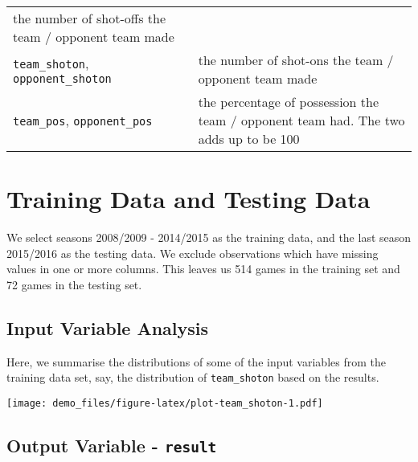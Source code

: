 \documentclass[]{book}
\theoremstyle{definition}
\theoremstyle{definition}
\theoremstyle{definition}
\theoremstyle{remark}
\begin{document}
\begin{longtable}[]{@{}ll@{}}
\begin{minipage}[t]{0.51\columnwidth}
the number of shot-offs the team / opponent team made\strut
\end{minipage}\tabularnewline
\begin{minipage}[t]{0.43\columnwidth}\raggedright\strut
\texttt{team\_shoton}, \texttt{opponent\_shoton}\strut
\end{minipage} & \begin{minipage}[t]{0.51\columnwidth}\raggedright\strut
the number of shot-ons the team / opponent team made\strut
\end{minipage}\tabularnewline
\begin{minipage}[t]{0.43\columnwidth}\raggedright\strut
\texttt{team\_pos}, \texttt{opponent\_pos}\strut
\end{minipage} & \begin{minipage}[t]{0.51\columnwidth}\raggedright\strut
the percentage of possession the team / opponent team had. The two adds
up to be 100\strut
\end{minipage}\tabularnewline
\bottomrule
\end{longtable}

\section{Training Data and Testing
Data}\label{training-data-and-testing-data}

We select seasons 2008/2009 - 2014/2015 as the training data, and the
last season 2015/2016 as the testing data. We exclude observations which
have missing values in one or more columns. This leaves us 514 games in
the training set and 72 games in the testing set.

\subsection{Input Variable Analysis}\label{input-variable-analysis}

Here, we summarise the distributions of some of the input variables from
the training data set, say, the distribution of \texttt{team\_shoton}
based on the results.

\texttt{[image: demo\_files/figure-latex/plot-team\_shoton-1.pdf]}

\subsection{\texorpdfstring{Output Variable -
\texttt{result}}{Output Variable - result}}\label{output-variable---result}
\end{document}
